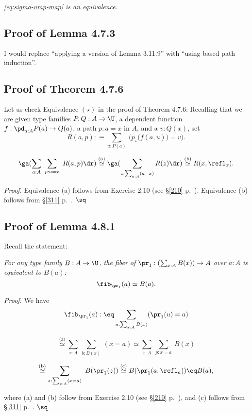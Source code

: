 \documentclass[12pt]{article}
\begin{document}
\nn{} \emph{\eqref{eq:sigma-ump-map} is an equivalence.}


\subsection{Proof of Lemma 4.7.3}

I would replace ``applying a version of Lemma 3.11.9'' with ``using based path induction''.


\subsection{Proof of Theorem 4.7.6}

Let us check Equivalence $(\star)$ in the proof of Theorem 4.7.6: Recalling that we are given type families $P,Q:A\to\U$, a dependent function $f:\pd_{a:A}P(a)\to Q(a)$, a path $p:a=x$ in $A$, and a $v:Q(x)$, set 
$$
R(a,p):\equiv\sum_{u:P(a)}\ \Big(p_\star\big(f(a,u)\big)=v\Big).
$$ 

\nn{}
$$
\ga(\sum_{a:A}\ \sum_{p:a=x}\ R(a,p)\dr)\overset{(\text a)}{\simeq}
\ga(\sum_{z:\sum_{a:A}(a=x)}R(z)\dr)\overset{(\text b)}{\simeq}
R(x,\refl_x).
$$

\nn\emph{Proof.} Equivalence (a) follows from Exercise 2.10 (see \S\ref{210} p.~\pageref{210}). Equivalence (b) follows from \S\ref{311} p.~\pageref{311}. $\sq$


\subsection{Proof of Lemma 4.8.1}\label{481}

Recall the statement:

\emph{For any type family $B:A\to\U$, the fiber of $\pr_1:(\sum_{x:A}B(x))\to A$ over $a:A$ is equivalent to $B(a)$:}
$$
\fib_{\pr_1}(a)\simeq B(a).
$$

\nn\emph{Proof.} We have
$$\fib_{\pr_1}(a):\eq\sum_{u:\sum_{x:A}B(x)}(\pr_1(u)=a)$$

$$\overset{\text{(a)}}\simeq\sum_{x:A}\ \sum_{b:B(x)}\ (x=a)\simeq\sum_{x:A}\ \sum_{p:x=a}\ B(x)$$

$$\overset{\text{(b)}}\simeq\sum_{z:\sum_{x:A}(x=a)}\ B(\pr_1(z))\overset{\text{(c)}}\simeq B(\pr_1(a,\refl_a))\eq B(a),$$ 

\nn where (a) and (b) follow from Exercise 2.10 (see \S\ref{210} p.~\pageref{210}), and (c) follows from \S\ref{311} p.~\pageref{311}. $\sq$
\end{document}
